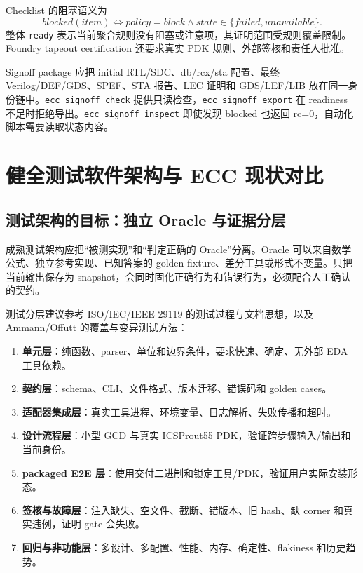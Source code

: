 \documentclass[UTF8,a4paper,11pt,fontset=fandol]{ctexart}
\numberwithin{equation}{section}
\newcommand{\code}[1]{\nolinkurl{#1}}
\begin{document}
Checklist 的阻塞语义为
\begin{equation}
blocked(item)\Longleftrightarrow policy=block
\land state\in\{failed,unavailable\}.
\end{equation}
整体 \code{ready} 表示当前聚合规则没有阻塞或注意项，其证明范围受规则覆盖限制。Foundry tapeout certification 还要求真实 PDK 规则、外部签核和责任人批准。

Signoff package 应把 initial RTL/SDC、db/rcx/sta 配置、最终 Verilog/DEF/GDS、SPEF、STA 报告、LEC 证明和 GDS/LEF/LIB 放在同一身份链中。\code{ecc signoff check} 提供只读检查，\code{ecc signoff export} 在 readiness 不足时拒绝导出。\code{ecc signoff inspect} 即使发现 blocked 也返回 rc=0，自动化脚本需要读取状态内容。

\section{健全测试软件架构与 ECC 现状对比}

\subsection{测试架构的目标：独立 Oracle 与证据分层}

成熟测试架构应把“被测实现”和“判定正确的 Oracle”分离。Oracle 可以来自数学公式、独立参考实现、已知答案的 golden fixture、差分工具或形式不变量。只把当前输出保存为 snapshot，会同时固化正确行为和错误行为，必须配合人工确认的契约。

测试分层建议参考 ISO/IEC/IEEE 29119 的测试过程与文档思想，以及 Ammann/Offutt 的覆盖与变异测试方法\cite{iso29119,testing}：
\begin{enumerate}
  \item \textbf{单元层}：纯函数、parser、单位和边界条件，要求快速、确定、无外部 EDA 工具依赖。
  \item \textbf{契约层}：schema、CLI、文件格式、版本迁移、错误码和 golden cases。
  \item \textbf{适配器集成层}：真实工具进程、环境变量、日志解析、失败传播和超时。
  \item \textbf{设计流程层}：小型 GCD 与真实 ICSProut55 PDK，验证跨步骤输入/输出和当前身份。
  \item \textbf{ packaged E2E 层}：使用交付二进制和锁定工具/PDK，验证用户实际安装形态。
  \item \textbf{签核与故障层}：注入缺失、空文件、截断、错版本、旧 hash、缺 corner 和真实违例，证明 gate 会失败。
  \item \textbf{回归与非功能层}：多设计、多配置、性能、内存、确定性、flakiness 和历史趋势。
\end{enumerate}
\end{document}
